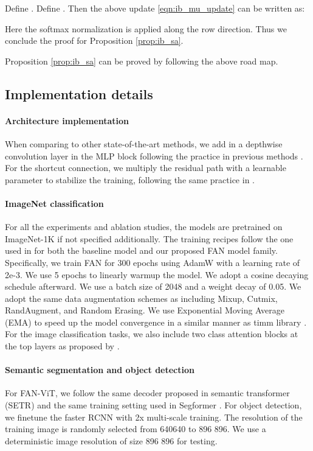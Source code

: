 \documentclass[nohyperref]{article}
\theoremstyle{plain}
\theoremstyle{definition}
\theoremstyle{remark}
\begin{document}
Define . Define . Then the above update \eqref{eqn:ib_mu_update} can be written as:

Here the softmax normalization is applied along the row direction. Thus we conclude the proof for Proposition \ref{prop:ib_sa}.

Proposition \ref{prop:ib_sa} can be proved by following the above road map.   



\subsection{Implementation details}  
\paragraph{Architecture implementation} When comparing to other state-of-the-art methods, we add in a depthwise convolution layer in the MLP block following the practice in previous methods \cite{xie2021segformer, el2021xcit}. For the shortcut connection, we multiply the residual path with a learnable parameter to stabilize the training, following the same practice in \cite{touvron2021going}.

\label{app:implementation_details}
\paragraph{ImageNet classification} For all the experiments and ablation studies, the models are pretrained on ImageNet-1K if not specified additionally. The training recipes   follow the one used in \cite{touvron2021training} for both the baseline model and our proposed FAN model family.
Specifically, 
we train FAN for 300
epochs using AdamW  with a learning rate of 2e-3.
We use 5 epochs to linearly warmup the model. We adopt a cosine decaying
schedule afterward. We use a batch size of 2048 and a
weight decay of 0.05. We adopt the same data augmentation schemes as \cite{touvron2021training}  including Mixup, Cutmix, RandAugment, and Random Erasing. 
We use Exponential Moving Average (EMA) to speed up the model convergence in a similar manner as timm library \cite{rw2019timm}. For the image classification tasks, we also include two class attention blocks at the top layers as proposed by \citeauthor{touvron2021going}.

\paragraph{Semantic segmentation and object detection} For FAN-ViT, we follow the same decoder proposed in semantic transformer (SETR) \cite{zheng2021rethinking} and the same training setting used in Segformer \cite{xie2021segformer}. For object detection, we finetune the faster RCNN \cite{ren2015faster} with 2x multi-scale training. The resolution of the training image is randomly selected from 640640 to 896  896. We use a deterministic image resolution of size 896 896 for testing.  
\end{document}
